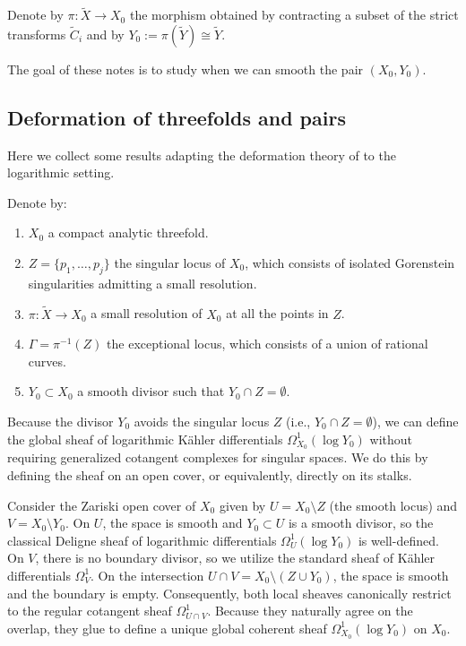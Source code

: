 \documentclass[11pt]{article}
\theoremstyle{definition}
\begin{document}
Denote by $\pi:\tilde{X}\to X_0$ the morphism obtained by contracting a subset of the strict transforms $\tilde{C}_i$ and by $Y_0:=\pi(\tilde{Y})\cong \tilde{Y}$.

The goal of these notes is to study when we can smooth the pair $(X_0,Y_0)$.


\subsection{Deformation of threefolds and pairs}\label{ss:DeformationPairs}
Here we collect some results adapting the deformation theory of \cite{F86} to the logarithmic setting. 

Denote by:
\begin{enumerate}
  \item $X_0$ a compact analytic threefold.
  \item $Z=\{p_1,\ldots, p_j\}$ the singular locus of $X_0$, which consists of isolated Gorenstein singularities admitting a small resolution.
  \item $\pi: \tilde{X}\to X_0$ a small resolution of $X_0$ at all the points in $Z$.
  \item $\Gamma=\pi^{-1}(Z)$ the exceptional locus, which consists of a union of rational curves.
  \item $Y_0\subset X_0$ a smooth divisor such that $Y_0 \cap Z = \emptyset$.
\end{enumerate}

Because the divisor $Y_0$ avoids the singular locus $Z$ (i.e., $Y_0 \cap Z = \emptyset$), we can define the global sheaf of logarithmic K\"ahler differentials $\Omega_{X_0}^1(\log Y_0)$ without requiring generalized cotangent complexes for singular spaces. We do this by defining the sheaf on an open cover, or equivalently, directly on its stalks.

Consider the Zariski open cover of $X_0$ given by $U = X_0 \setminus Z$ (the smooth locus) and $V = X_0 \setminus Y_0$. 
On $U$, the space is smooth and $Y_0 \subset U$ is a smooth divisor, so the classical Deligne sheaf of logarithmic differentials $\Omega_U^1(\log Y_0)$ is well-defined. 
On $V$, there is no boundary divisor, so we utilize the standard sheaf of K\"ahler differentials $\Omega_V^1$. 
On the intersection $U \cap V = X_0 \setminus (Z \cup Y_0)$, the space is smooth and the boundary is empty. Consequently, both local sheaves canonically restrict to the regular cotangent sheaf $\Omega_{U \cap V}^1$. Because they naturally agree on the overlap, they glue to define a unique global coherent sheaf $\Omega_{X_0}^1(\log Y_0)$ on $X_0$.
\end{document}
